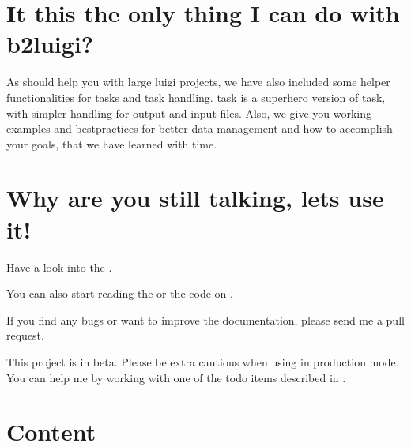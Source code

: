 \documentclass[letterpaper,10pt,english]{sphinxmanual}
\begin{document}
\chapter{It this the only thing I can do with b2luigi?}
\label{\detokenize{index:it-this-the-only-thing-i-can-do-with-b2luigi}}
As  should help you with large luigi projects, we have also included some helper functionalities for
 tasks and task handling.
 task is a super\sphinxhyphen{}hero version of  task, with simpler handling for output and input files.
Also, we give you working examples and best\sphinxhyphen{}practices for better data management and how to accomplish your goals,
that we have learned with time.


\chapter{Why are you still talking, lets use it!}
\label{\detokenize{index:why-are-you-still-talking-lets-use-it}}
Have a look into the {\hyperref[\detokenize{usage/quickstart:quick-start-label}]{}}.

You can also start reading the {\hyperref[\detokenize{documentation/api:api-documentation-label}]{}} or the code on .

If you find any bugs or want to improve the documentation, please send me a pull request.

This project is in beta. Please be extra cautious when using in production mode.
You can help me by working with one of the todo items described in {\hyperref[\detokenize{advanced/development:development-label}]{}}.


\chapter{Content}
\label{\detokenize{index:content}}
\end{document}
